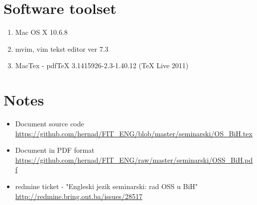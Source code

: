 \documentclass[times, utf8, seminar]{fit}
\begin{document}



\appendix

\chapter{Software toolset}
\begin{enumerate}
  \item Mac OS X 10.6.8
  \item mvim, vim tekst editor ver 7.3
  \item MacTex - pdfTeX 3.1415926-2.3-1.40.12 (TeX Live 2011)
\end{enumerate}

\chapter{Notes}

\begin{itemize}
  \item Document source code \url{https://github.com/hernad/FIT\_ENG/blob/master/seminarski/OS\_BiH.tex}
  \item Document in PDF format \url{https://github.com/hernad/FIT\_ENG/raw/master/seminarski/OSS\_BiH.pdf}
  \item redmine ticket - "Engleski jezik seminarski: rad OSS u BiH" \url{http://redmine.bring.out.ba/issues/28517}

\end{itemize}
\end{document}
